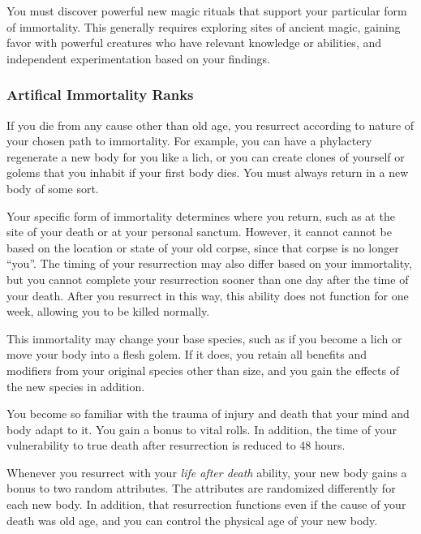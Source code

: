      You must discover powerful new magic rituals that support your particular form of immortality. This generally requires exploring sites of ancient magic, gaining favor with powerful creatures who have relevant knowledge or abilities, and independent experimentation based on your findings.

    \subsubsection{Artifical Immortality Ranks}

       If you die from any cause other than old age, you resurrect according to nature of your chosen path to immortality.
      For example, you can have a phylactery regenerate a new body for you like a lich, or you can create clones of yourself or golems that you inhabit if your first body dies.
      You must always return in a new body of some sort.

      Your specific form of immortality determines where you return, such as at the site of your death or at your personal sanctum.
      However, it cannot cannot be based on the location or state of your old corpse, since that corpse is no longer ``you''.
      The timing of your resurrection may also differ based on your immortality, but you cannot complete your resurrection sooner than one day after the time of your death. After you resurrect in this way, this ability does not function for one week, allowing you to be killed normally.

      This immortality may change your base species, such as if you become a lich or move your body into a flesh golem. If it does, you retain all benefits and modifiers from your original species other than size, and you gain the effects of the new species in addition.

       You become so familiar with the trauma of injury and death that your mind and body adapt to it.
      You gain a  bonus to vital rolls.
      In addition, the time of your vulnerability to true death after resurrection is reduced to 48 hours.

       Whenever you resurrect with your \textit{life after death} ability, your new body gains a  bonus to two random attributes. The attributes are randomized differently for each new body. In addition, that resurrection functions even if the cause of your death was old age, and you can control the physical age of your new body.

